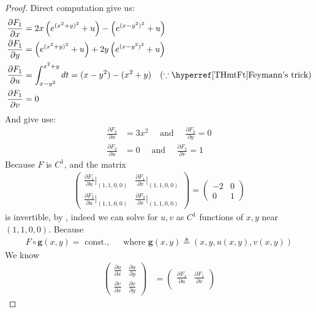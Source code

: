 \documentclass{report}
\begin{document}
\begin{proof}
Direct computation give us: 
\begin{align*}
\frac{\partial F_1}{\partial x}&= 2x\left(e^{(x^2+y)^2} +u \right) - \left(e^{(x-y^2)^2} +u \right) \\
\frac{\partial F_1}{\partial y}&= \left(e^{(x^2+y)^2} +u \right) + 2y \left(e^{(x-y^2)^2}+ u \right) \\
\frac{\partial F_1}{\partial u}&=  \int_{x-y^2}^{x^2+y} dt= (x-y^2)-(x^2+y) \quad (\because \text{\customref{THmtFt}{Feymann's trick}})\\
\frac{\partial F_1}{\partial v}&=0 
\end{align*}
And give use:
\begin{align*}
\frac{\partial F_2}{\partial x}&= 3x^2 \quad \text{ and }\quad \frac{\partial F_2}{\partial y}=0 \\
\frac{\partial F_2}{\partial u}&= 0 \quad \text{ and }\quad \frac{\partial F_2}{\partial v}= 1
\end{align*}
Because $F$ is  $C^1$, and the matrix 
\begin{align*}
\begin{pmatrix} 
  \frac{\partial F_1}{\partial u} \big|_{(1,1,0,0)} & \frac{\partial F_1}{\partial v} \big|_{(1,1,0,0)}  \\
  \frac{\partial F_2}{\partial u} \big|_{(1,1,0,0)} & \frac{\partial F_2}{\partial v} \big|_{(1,1,0,0)}  
\end{pmatrix} = \begin{pmatrix} 
  -2 & 0\\
  0 & 1 
\end{pmatrix}
\end{align*}
is invertible, by , indeed we can solve for $u,v$ as $C^1$ functions of  $x,y$ near $(1,1,0,0)$. Because 
\begin{align*}
F\circ \textbf{g}(x,y)=\text{ const., }\quad \text{ where } \textbf{g}(x,y)\triangleq (x,y, u(x,y),v(x,y))
\end{align*}
We know 
\begin{align*}
\begin{pmatrix} 
  \frac{\partial u}{\partial x} & \frac{\partial u}{\partial y} \\
  \frac{\partial v}{\partial x} & \frac{\partial v}{\partial y}
\end{pmatrix} &= \begin{pmatrix} 
  \frac{\partial F_1}{\partial u} & \frac{\partial F_1}{\partial v} \\

\end{pmatrix}
\end{align*}
\end{proof}
\end{document}
